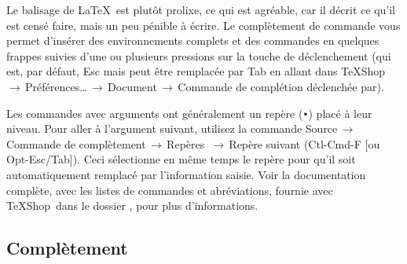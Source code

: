 \documentclass[11pt,french]{article}
\newcommand{\TS}{\textsf{\TeX Shop}}
\newcommand{\cmd}[1]{\textsf{#1}}
\newcommand{\mnu}[1]{\textsf{#1}}
\newcommand{\To}{\,\(\to\)\,}
\begin{document}
Le balisage de \LaTeX\ est plutôt prolixe, ce qui est agréable, car il décrit ce qu'il est censé faire, mais un peu pénible à écrire. Le complètement de commande vous permet d'insérer des environnements complets et des commandes en quelques frappes suivies d'une ou plusieurs pressions  sur la touche de déclenchement (qui est, par défaut, \cmd{Esc} mais peut être remplacée par \cmd{Tab} en allant dans \mnu{TeXShop}\To\mnu{Préférences…}\To\mnu{Document}\To\mnu{Commande de complétion déclenchée par}).

Les commandes avec arguments ont généralement un repère (\texttt{•}) placé à leur niveau. Pour aller à l'argument suivant, utilisez la commande \mnu{Source}\To\mnu{Commande de complètement}\To\mnu{Repères} \To\mnu{Repère suivant} (\cmd{Ctl-Cmd-F} [ou \cmd{Opt-Esc/Tab}]). Ceci sélectionne en même temps le repère pour qu'il soit automatiquement remplacé par l'information saisie. Voir la documentation complète, avec les listes de commandes et abréviations, fournie avec \TS\ dans le dossier , pour plus d'informations.



\subsection{Complètement}
\end{document}
